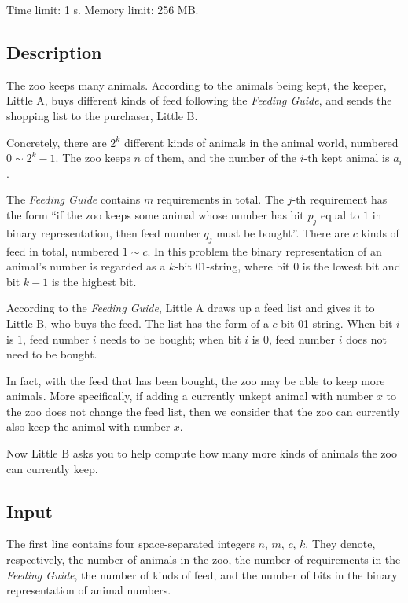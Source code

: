 \documentclass[11pt]{article}
\begin{document}
\noindent
Time limit: 1 s.
Memory limit: 256 MB.

\subsection*{Description}

The zoo keeps many animals.
According to the animals being kept, the keeper, Little A, buys different kinds
of feed following the \emph{Feeding Guide}, and sends the shopping list to the
purchaser, Little B.

Concretely, there are $2^k$ different kinds of animals in the animal world,
numbered $0 \sim 2^k - 1$.
The zoo keeps $n$ of them, and the number of the $i$-th kept animal is $a_i$.

The \emph{Feeding Guide} contains $m$ requirements in total.
The $j$-th requirement has the form
``if the zoo keeps some animal whose number has bit $p_j$ equal to $1$ in
binary representation, then feed number $q_j$ must be bought''.
There are $c$ kinds of feed in total, numbered $1 \sim c$.
In this problem the binary representation of an animal's number is regarded
as a $k$-bit 01-string, where bit $0$ is the lowest bit and bit $k-1$ is the
highest bit.

According to the \emph{Feeding Guide}, Little A draws up a feed list and gives
it to Little B, who buys the feed.
The list has the form of a $c$-bit 01-string.
When bit $i$ is $1$, feed number $i$ needs to be bought;
when bit $i$ is $0$, feed number $i$ does not need to be bought.

In fact, with the feed that has been bought, the zoo may be able to keep more
animals.
More specifically, if adding a currently unkept animal with number $x$ to the
zoo does not change the feed list, then we consider that the zoo can currently
also keep the animal with number $x$.

Now Little B asks you to help compute how many more kinds of animals the zoo
can currently keep.

\subsection*{Input}

The first line contains four space-separated integers $n$, $m$, $c$, $k$.
They denote, respectively, the number of animals in the zoo, the number of
requirements in the \emph{Feeding Guide}, the number of kinds of feed, and the
number of bits in the binary representation of animal numbers.
\end{document}
